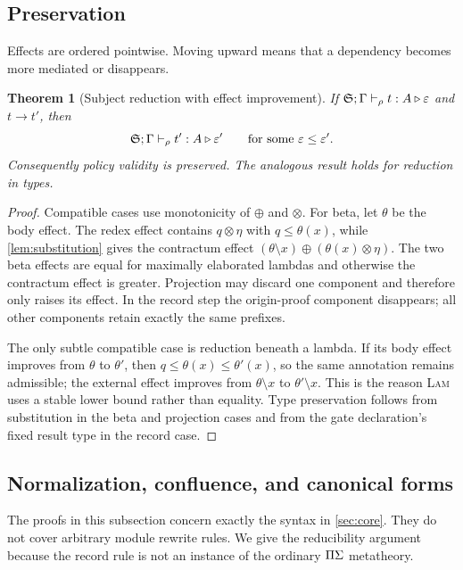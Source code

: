 \documentclass[11pt]{article}
\numberwithin{equation}{section}
\theoremstyle{definition}
\theoremstyle{plain}
\newtheorem{theorem}[definition]{Theorem}
\theoremstyle{remark}
\newcommand{\eps}{\varepsilon}
\begin{document}
\subsection{Preservation}

Effects are ordered pointwise.  Moving upward means that a dependency becomes
more mediated or disappears.

\begin{theorem}[Subject reduction with effect improvement]
\label{thm:preservation}
If
\(
 \AFDeclSignature;\Gamma\vdash_{\rho} t:A\triangleright\eps
\)
and \(t\longrightarrow t'\), then
\[
 \AFDeclSignature;\Gamma\vdash_{\rho} t':A\triangleright\eps'
 \qquad\text{for some }\eps\le\eps'.
\]
Consequently policy validity is preserved.  The analogous result holds for
reduction in types.
\end{theorem}

\begin{proof}
Compatible cases use monotonicity of \(\oplus\) and \(\otimes\).  For beta,
let \(\theta\) be the body effect.  The redex effect contains
\(q\otimes\eta\) with \(q\le\theta(x)\), while
\cref{lem:substitution} gives the contractum effect
\((\theta\setminus x)\oplus(\theta(x)\otimes\eta)\).  The two beta effects
are equal for maximally elaborated lambdas and otherwise the contractum effect
is greater.  Projection may discard one component and therefore only raises
its effect.  In the record step the origin-proof component disappears; all
other components retain exactly the same prefixes.

The only subtle compatible case is reduction beneath a lambda.  If its body
effect improves from \(\theta\) to \(\theta'\), then
\(q\le\theta(x)\le\theta'(x)\), so the same annotation remains admissible;
the external effect improves from \(\theta\setminus x\) to
\(\theta'\setminus x\).  This is the reason \textsc{Lam} uses a stable lower
bound rather than equality.  Type preservation follows from substitution in
the beta and projection cases and from the gate declaration's fixed result
type in the record case.
\end{proof}

\subsection{Normalization, confluence, and canonical forms}

The proofs in this subsection concern exactly the syntax in
\cref{sec:core}.  They do not cover arbitrary module rewrite rules.  We give
the reducibility argument because the record rule is not an instance of the
ordinary \(\Pi\Sigma\) metatheory.
\end{document}
